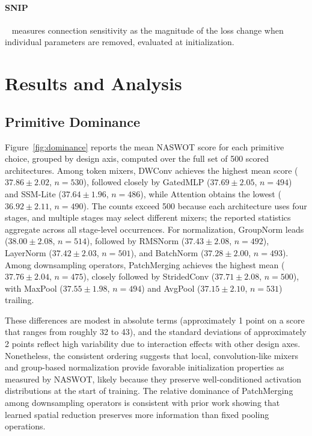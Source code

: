\documentclass[10pt,twocolumn,letterpaper]{article}
\newcommand{\naswot}{NASWOT\xspace}
\begin{document}
\paragraph{SNIP}~\cite{abdelfattah2021zerocost} measures connection sensitivity as the magnitude of the loss change when individual parameters are removed, evaluated at initialization.

\section{Results and Analysis}
\label{sec:results}

\subsection{Primitive Dominance}
\label{sec:dominance}

Figure~\ref{fig:dominance} reports the mean \naswot score for each primitive choice, grouped by design axis, computed over the full set of 500 scored architectures. Among token mixers, DWConv achieves the highest mean score ($37.86 \pm 2.02$, $n = 530$), followed closely by GatedMLP ($37.69 \pm 2.05$, $n = 494$) and SSM-Lite ($37.64 \pm 1.96$, $n = 486$), while Attention obtains the lowest ($36.92 \pm 2.11$, $n = 490$). The counts exceed 500 because each architecture uses four stages, and multiple stages may select different mixers; the reported statistics aggregate across all stage-level occurrences. For normalization, GroupNorm leads ($38.00 \pm 2.08$, $n = 514$), followed by RMSNorm ($37.43 \pm 2.08$, $n = 492$), LayerNorm ($37.42 \pm 2.03$, $n = 501$), and BatchNorm ($37.28 \pm 2.00$, $n = 493$). Among downsampling operators, PatchMerging achieves the highest mean ($37.76 \pm 2.04$, $n = 475$), closely followed by StridedConv ($37.71 \pm 2.08$, $n = 500$), with MaxPool ($37.55 \pm 1.98$, $n = 494$) and AvgPool ($37.15 \pm 2.10$, $n = 531$) trailing.

These differences are modest in absolute terms (approximately 1 point on a score that ranges from roughly 32 to 43), and the standard deviations of approximately 2 points reflect high variability due to interaction effects with other design axes. Nonetheless, the consistent ordering suggests that local, convolution-like mixers and group-based normalization provide favorable initialization properties as measured by \naswot, likely because they preserve well-conditioned activation distributions at the start of training. The relative dominance of PatchMerging among downsampling operators is consistent with prior work showing that learned spatial reduction preserves more information than fixed pooling operations.
\end{document}
